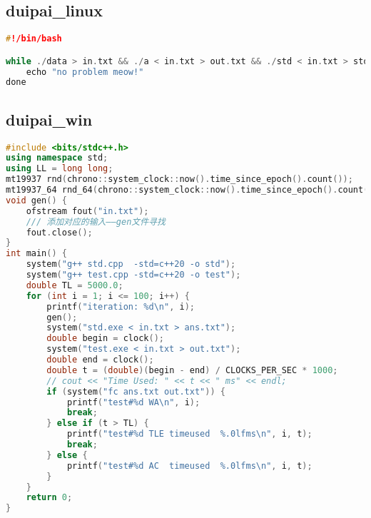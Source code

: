\subsection{duipai\_linux}
\begin{lstlisting}[language=C++]
#!/bin/bash

while ./data > in.txt && ./a < in.txt > out.txt && ./std < in.txt > std.txt && diff out.txt std.txt; do
    echo "no problem meow!"
done
\end{lstlisting}
\subsection{duipai\_win}
\begin{lstlisting}[language=C++]
#include <bits/stdc++.h>
using namespace std;
using LL = long long;
mt19937 rnd(chrono::system_clock::now().time_since_epoch().count());
mt19937_64 rnd_64(chrono::system_clock::now().time_since_epoch().count());
void gen() {
    ofstream fout("in.txt");
    /// 添加对应的输入——gen文件寻找
    fout.close();
}
int main() {
    system("g++ std.cpp  -std=c++20 -o std");
    system("g++ test.cpp -std=c++20 -o test");
    double TL = 5000.0;
    for (int i = 1; i <= 100; i++) {
        printf("iteration: %d\n", i);
        gen();
        system("std.exe < in.txt > ans.txt");
        double begin = clock();
        system("test.exe < in.txt > out.txt");
        double end = clock();
        double t = (double)(begin - end) / CLOCKS_PER_SEC * 1000;
        // cout << "Time Used: " << t << " ms" << endl;
        if (system("fc ans.txt out.txt")) {
            printf("test#%d WA\n", i);
            break;
        } else if (t > TL) {
            printf("test#%d TLE timeused  %.0lfms\n", i, t);
            break;
        } else {
            printf("test#%d AC  timeused  %.0lfms\n", i, t);
        }
    }
    return 0;
}
\end{lstlisting}
